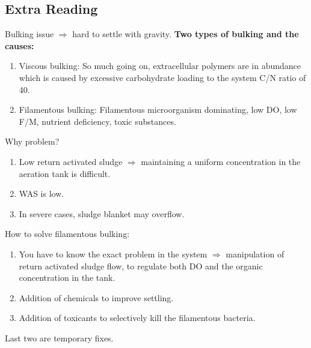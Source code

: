 \documentclass{article}
\numberwithin{equation}{section}
\begin{document}
\subsection{Extra Reading}
Bulking issue $\Rightarrow$ hard to settle with gravity.
\textbf{Two types of bulking and the causes:}
\begin{enumerate}
    \item Viscous bulking: So much going on, extracellular polymers are in abundance which is caused by excessive carbohydrate loading to the system C/N ratio of 40.
    \item Filamentous bulking: Filamentous microorganism dominating, low DO, low F/M, nutrient deficiency, toxic substances.
\end{enumerate}
Why problem?
\begin{enumerate}
    \item Low return activated sludge $\Rightarrow$ maintaining a uniform concentration in the aeration tank is difficult.
    \item WAS is low.
    \item In severe cases, sludge blanket may overflow.
\end{enumerate}
How to solve filamentous bulking:
\begin{enumerate}
    \item You have to know the exact problem in the system $\Rightarrow$ manipulation of return activated sludge flow, to regulate both DO and the organic concentration in the tank.
    \item Addition of chemicals to improve settling.
    \item Addition of toxicants to selectively kill the filamentous bacteria.
\end{enumerate}
Last two are temporary fixes.
\end{document}

